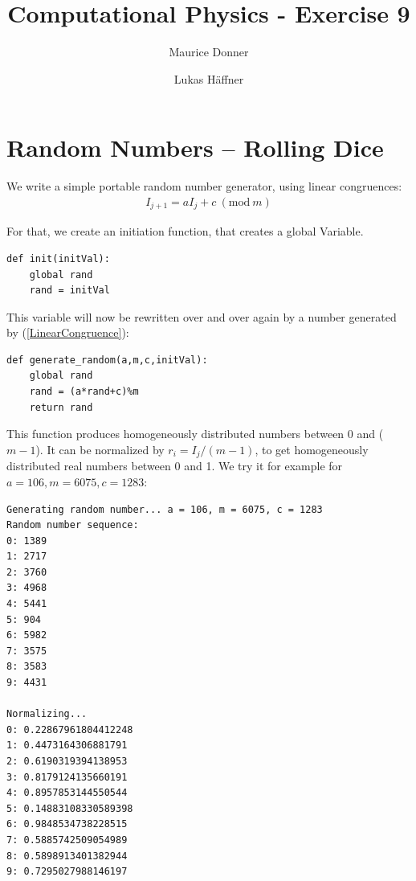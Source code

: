\documentclass{article}
\title{Computational Physics - Exercise 9}
\author{Maurice Donner \and Lukas Häffner}
\begin{document}
\maketitle
\newpage

\section{Random Numbers -- Rolling Dice}

We write a simple portable random number generator, using linear congruences:
\begin{align}
    I _{j+1} = a I _{j} + c \ ( \text{mod} \ m )
    \label{LinearCongruence}
\end{align}

For that, we create an initiation function, that creates a global Variable.

\begin{lstlisting}
def init(initVal):
    global rand
    rand = initVal
\end{lstlisting}

This variable will now be rewritten over and over again by a number generated
by (\ref{LinearCongruence}):

\begin{lstlisting}
def generate_random(a,m,c,initVal):
    global rand
    rand = (a*rand+c)%m
    return rand
\end{lstlisting}

This function produces homogeneously distributed numbers between 0 and ($m-1$).
It can be normalized by \( r_i = I_j /(m-1) \), to get homogeneously distributed
real numbers between 0 and 1. We try it for example for \( a = 106, m = 6075,
c = 1283\):
\begin{lstlisting}
Generating random number... a = 106, m = 6075, c = 1283
Random number sequence:
0: 1389
1: 2717
2: 3760
3: 4968
4: 5441
5: 904
6: 5982
7: 3575
8: 3583
9: 4431

Normalizing...
0: 0.22867961804412248
1: 0.4473164306881791
2: 0.6190319394138953
3: 0.8179124135660191
4: 0.8957853144550544
5: 0.14883108330589398
6: 0.9848534738228515
7: 0.5885742509054989
8: 0.5898913401382944
9: 0.7295027988146197
\end{lstlisting}
\end{document}
